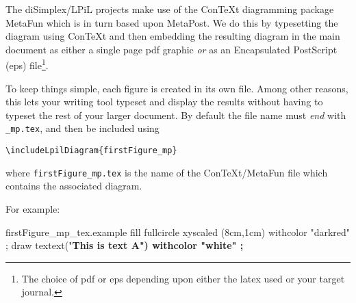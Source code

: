 

The diSimplex/LPiL projects make use of the ConTeXt diagramming package MetaFun
which is in turn based upon MetaPost. We do this by typesetting the diagram
using ConTeXt and then embedding the resulting diagram in the main document as
either a single page pdf graphic \emph{or} as an Encapsulated PostScript (eps)
file\footnote{The choice of pdf or eps depending upon either the latex
used or your target journal.}.

To keep things simple, each figure is created in its own file. Among other
reasons, this lets your writing tool typeset and display the results without
having to typeset the rest of your larger document. By default the file name
must \emph{end} with \verb|_mp.tex|, and then be included using
\begin{center}
  \verb|\includeLpilDiagram{firstFigure_mp}|
\end{center}
\noindent where \verb|firstFigure_mp.tex| is
the name of the ConTeXt/MetaFun file which contains the associated diagram.

For example:

\begin{lpil:metaFun}{firstFigure_mp_tex.example}
\startMPpage
fill fullcircle xyscaled (8cm,1cm) withcolor "darkred" ;
draw textext("\bf This is text A") withcolor "white" ;
\stopMPpage
\end{lpil:metaFun}

